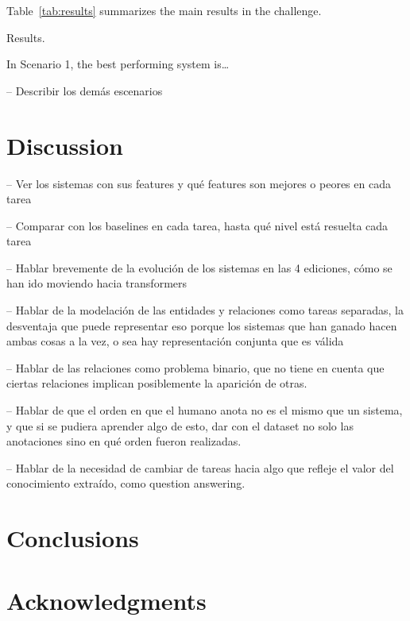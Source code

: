 \documentclass[a4paper,11pt,twocolumn,twoside]{article}
\begin{document}
Table~\ref{tab:results} summarizes the main results in the challenge.

\begin{table}
  \caption{Results.\label{tab:results}}
\end{table}

In Scenario 1, the best performing system is\dots

-- Describir los demás escenarios

\section{Discussion}\label{sec:discussion}

-- Ver los sistemas con sus features y qué features son mejores o peores en cada tarea

-- Comparar con los baselines en cada tarea, hasta qué nivel está resuelta cada tarea

-- Hablar brevemente de la evolución de los sistemas en las 4 ediciones,
cómo se han ido moviendo hacia transformers

-- Hablar de la modelación de las entidades y relaciones como tareas separadas,
la desventaja que puede representar eso porque los sistemas que han ganado hacen
ambas cosas a la vez, o sea hay representación conjunta que es válida

-- Hablar de las relaciones como problema binario, que no tiene en cuenta que ciertas
relaciones implican posiblemente la aparición de otras.

-- Hablar de que el orden en que el humano anota no es el mismo que un sistema,
y que si se pudiera aprender algo de esto, dar con el dataset no solo las anotaciones
sino en qué orden fueron realizadas.

-- Hablar de la necesidad de cambiar de tareas hacia algo que refleje el valor
del conocimiento extraído, como question answering.

\section{Conclusions}\label{sec:conclusions}

\section*{Acknowledgments}



\end{document}
